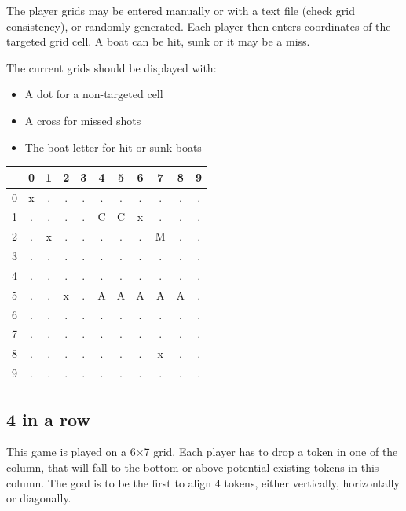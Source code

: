 \documentclass{ecnreport}
\begin{document}
The player grids may be entered manually or with a text file (check grid consistency), or randomly generated.
Each player then enters coordinates of the targeted grid cell. A boat can be hit, sunk or it may be a miss. 

The current grids should be displayed with:
\begin{itemize}
 \item A dot for a non-targeted cell
 \item A cross for missed shots
 \item The boat letter for hit or sunk boats
\end{itemize}

\begin{center}
 \begin{tabular}{|c|c|c|c|c|c|c|c|c|c|c|}
 \hline 
 & 0 & 1 & 2& 3&4 &5 &6 & 7&  8&9 \\\hline
 0 &x&.&.&. &.& .&.&.&.&.\\\hline
 1 &.&.&.&. &C&C&x&.&.&.\\\hline
 2 &.&x&.&. &.&.&.&M&.&.\\\hline
 3 &.&.&.&. &.&.&.&.&.&.\\\hline
 4 &.&.&.&. &.&.&.&.&.&.\\\hline
 5 &.&.&x&. &A&A&A&A&A&.\\\hline
 6 &.&.&.&. &.&.&.&.&.&.\\\hline
 7 &.&.&.&. &.&.&.&.&.&.\\\hline
 8 &.&.&.&. &.&.&.&x&.&.\\\hline
 9 &.&.&.&. &.&.&.&.&.&.\\\hline
 \end{tabular}
\end{center}
\begin{itemize}
\end{itemize}


\subsection{4 in a row}

This game is played on a 6$\times$7 grid. Each player has to drop a token in one of the column, that will fall to the bottom or above potential existing tokens in this column.
The goal is to be the first to align 4 tokens, either vertically, horizontally or diagonally.
\end{document}

